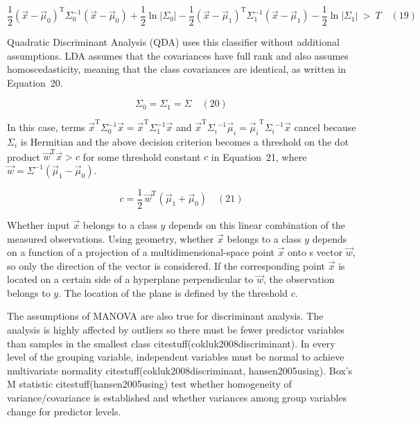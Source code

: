\documentclass[preprint,12pt]{elsarticle}
\begin{document}
\begin{equation}
	{\frac{1}{2}}({\vec{x}}-{\vec{\mu}}_{0})^{\mathrm{T}}\Sigma_{0}^{-1}({\vec{x}}-{\vec{\mu}}_{0})+{\frac{1}{2}}\ln |\Sigma_{0}|-{\frac{1}{2}}({\vec{x}}-{\vec{\mu}}_{1})^{\mathrm{T}}\Sigma_{1}^{-1}({\vec{x}}-{\vec{\mu}}_{1})-{\frac{1}{2}}\ln |\Sigma_{1}|\ >\ T
	\quad\left(19\right)
\end{equation}

Quadratic Discriminant Analysis (QDA) uses this classifier without additional assumptions. LDA assumes that the covariances have full rank and also assumes homoscedasticity, meaning that the class covariances are identical, as written in Equation~20.

\begin{equation}
	\Sigma_{0}=\Sigma_{1}=\Sigma
	\quad\left(20\right)
\end{equation}

In this case, terms ${\vec{x}}^{\mathrm{T}}\Sigma_{0}^{-1}{\vec{x}}={\vec{x}}^{\mathrm{T}}\Sigma_{1}^{-1}{\vec{x}}$ and ${\vec{x}}^{\mathrm{T}}{\Sigma_{i}}^{-1}{\vec{\mu}}_{i}={{\vec{\mu}}_{i}}^{\mathrm{T}}{\Sigma_{i}}^{-1}{\vec{x}}$ cancel because $\Sigma_{i}$ is Hermitian and the above decision criterion becomes a threshold on the dot product ${\vec{w}}^{\mathrm{T}}{\vec{x}}>c$ for some threshold constant $c$ in Equation~21, where ${\vec{w}}=\Sigma ^{-1}({\vec{\mu}}_{1}-{\vec{\mu}}_{0})$.

\begin{equation}
	c={\frac{1}{2}}\,{\vec{w}}^{\mathrm{T}}({\vec{\mu}}_{1}+{\vec{\mu}}_{0})
	\quad\left(21\right)
\end{equation}

Whether input $\vec{x}$ belongs to a class $y$ depends on this linear combination of the measured observations. Using geometry, whether $\vec{x}$ belongs to a class $y$ depends on a function of a projection of a multidimensional-space point $\vec{x}$ onto s vector $\vec{w}$, so only the direction of the vector is considered. If the corresponding point $\vec{x}$ is located on a certain side of a hyperplane perpendicular to $\vec{w}$, the observation belongs to $y$. The location of the plane is defined by the threshold $c$.

The assumptions of MANOVA are also true for discriminant analysis. The analysis is highly affected by outliers so there must be fewer predictor variables than samples in the smallest class citestuff(cokluk2008discriminant). In every level of the grouping variable, independent variables must be normal to achieve multivariate normality citestuff(cokluk2008discriminant, hansen2005using). Box's M statistic citestuff(hansen2005using) test whether homogeneity of variance/covariance is established and whether variances among group variables change for predictor levels. 
\end{document}
